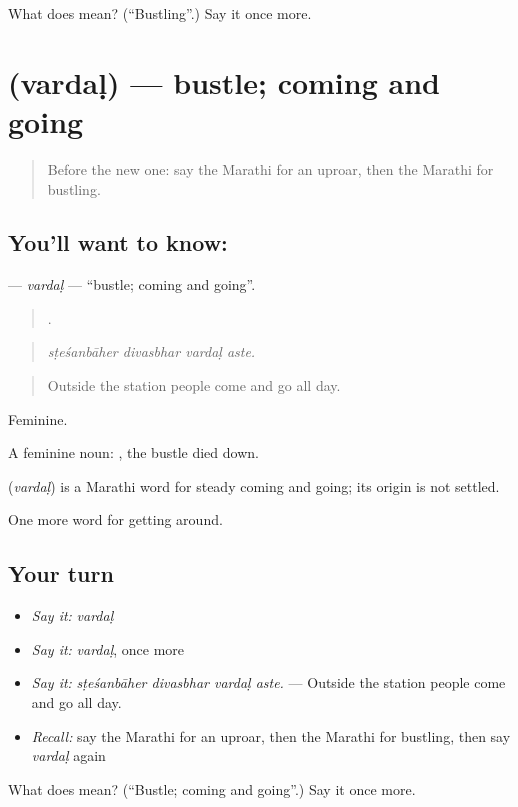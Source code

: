 \begin{tcolorbox}[breakable,colback=teal!4,colframe=teal!35!black,title={Before you move on}]
What does  mean? (\textquotedblleft{}Bustling\textquotedblright{}.) Say it once more.
\end{tcolorbox}
\section[\texorpdfstring{\mr{वर्दळ} (vardaḷ)}{वर्दळ (vardaḷ)}]{ (vardaḷ) — bustle; coming and going}

\label{lesson:MR-C422-vardal}



\begin{quote}
Before the new one: say the Marathi for an uproar, then the Marathi for bustling.
\end{quote}

\subsection*{You'll want to know: }
\textbf{} — \emph{vardaḷ} — \textquotedblleft{}bustle; coming and going\textquotedblright{}.

\begin{quote}
   .
\end{quote}

\begin{quote}
\emph{sṭeśanbāher divasbhar vardaḷ aste.}
\end{quote}

\begin{quote}
Outside the station people come and go all day.
\end{quote}

Feminine.

A feminine noun:   , the bustle died down.

\begin{cousinweb}
\textbf{} (\emph{vardaḷ}) is a Marathi word for steady coming and going; its origin is not settled.
\end{cousinweb}

\begin{grammarlens}[title={What you've built}]
One more word for getting around.
\end{grammarlens}

\subsection*{Your turn}
\begin{itemize}
\raggedright
  \item \emph{Say it:} \emph{vardaḷ}
  \item \emph{Say it:} \emph{vardaḷ}, once more
  \item \emph{Say it:} \emph{sṭeśanbāher divasbhar vardaḷ aste.} — Outside the station people come and go all day.
  \item \emph{Recall:} say the Marathi for an uproar, then the Marathi for bustling, then say \emph{vardaḷ} again
\end{itemize}

\begin{tcolorbox}[breakable,colback=teal!4,colframe=teal!35!black,title={Before you move on}]
What does  mean? (\textquotedblleft{}Bustle; coming and going\textquotedblright{}.) Say it once more.
\end{tcolorbox}
